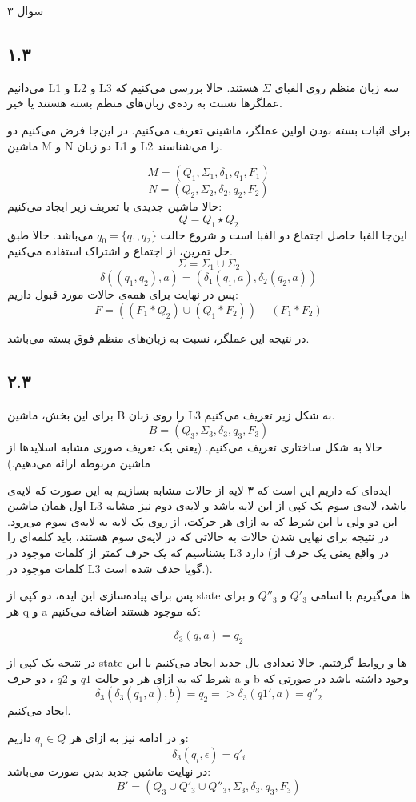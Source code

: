 سوال ۳

\subsection*{۱.۳}

می‌دانیم L1 و L2 و L3 سه زبان منظم روی الفبای 
$\Sigma$
هستند. حالا بررسی می‌کنیم که عملگرها نسبت به رده‌ی زبان‌های منظم بسته هستند یا خیر.

 برای اثبات بسته بودن اولین عملگر، ماشینی تعریف می‌کنیم. در این‌جا فرض می‌کنیم دو ماشین M و N دو زبان L1 و L2 را می‌شناسند.
 
$$M = (Q_1, \Sigma_1, \delta_1, q_1, F_1)$$
$$N = (Q_2, \Sigma_2, \delta_2, q_2, F_2)$$
 حالا ماشین جدیدی با تعریف زیر ایجاد می‌کنیم:
$$Q = Q_1 \star Q_2$$
 این‌جا الفبا حاصل اجتماع دو الفبا است و شروع حالت 
$q_0 = \{ q_1, q_2\}$
 می‌باشد. حالا طبق حل تمرین، از اجتماع و اشتراک استفاده می‌کنیم.
$$\Sigma = \Sigma_1 \cup \Sigma_2$$
$$\delta ((q_1, q_2), a) = (\delta_1 (q_1, a), \delta_2 (q_2, a))$$
پس در نهایت برای همه‌ی حالات مورد قبول داریم:
$$F = ((F_1 * Q_2) \cup (Q_1 * F_2)) - (F_1 * F_2)$$

در نتیجه این عملگر، نسبت به زبان‌های منظم فوق بسته می‌باشد.

\subsection*{۲.۳}

برای این بخش، ماشین B را روی زبان L3 به شکل زیر تعریف می‌کنیم.
$$B = (Q_3, \Sigma_3, \delta_3, q_3, F_3)$$
حالا به شکل ساختاری تعریف می‌کنیم. (یعنی یک تعریف صوری مشابه اسلایدها از ماشین مربوطه ارائه می‌دهیم.)

ایده‌ای که داریم این است که ۳ لایه از حالات مشابه بسازیم به این صورت که لایه‌ی اول همان ماشین L3 باشد، لایه‌ی سوم یک کپی از این لایه باشد و لایه‌ی دوم نیز مشابه این دو ولی با این شرط که به ازای هر حرکت، از روی یک لایه به لایه‌ی سوم می‌رود. در نتیجه برای نهایی شدن حالات به حالاتی که در لایه‌ی سوم هستند، باید کلمه‌ای را بشناسیم که یک حرف کمتر از کلمات موجود در L3 دارد (در واقع یعنی یک حرف از کلمات موجود در L3 گویا حذف شده است.).

پس برای پیاده‌سازی این ایده، دو کپی از state ها می‌گیریم با اسامی 
$Q'_3$
و
$Q''_3$
و برای هر q و a که موجود هستند اضافه می‌کنیم:

$$\delta_3 (q, a) = q_2$$

در نتیجه یک کپی از state ها و روابط گرفتیم.
حالا تعدادی یال جدید ایجاد می‌کنیم با این شرط که به ازای هر دو حالت
$q1$
و
$q2$
، دو حرف a و b وجود داشته باشد در صورتی که 
$$\delta_3 (\delta_3 (q_1, a), b) = q_2 => \delta_3(q1', a) = q''_2$$
ایجاد می‌کنیم.

و در ادامه نیز به ازای هر 
$q_i \in Q$
داریم:
$$\delta_3 (q_i, \epsilon) = q'_i$$
در نهایت ماشین جدید بدین صورت می‌باشد:
$$B' = (Q_3 \cup Q'_3 \cup Q''_3, \Sigma_3, \delta_3, q_3, F_3)$$
